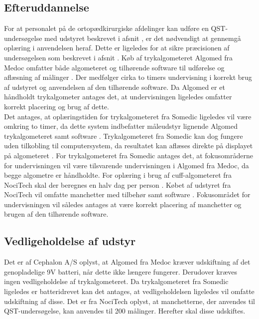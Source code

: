 \subsection{Efteruddannelse}
For at personalet på de ortopædkirurgiske afdelinger kan udføre en QST-undersøgelse med udstyret beskrevet i afsnit , er det nødvendigt at gennemgå oplæring i anvendelsen heraf. Dette er ligeledes for at sikre præcisionen af undersøgelsen som beskrevet i afsnit . Køb af trykalgometeret Algomed fra Medoc omfatter både algometeret og tilhørende software til udførelse og aflæsning af målinger \citep{AlgomedData}. Der medfølger cirka to timers undervisning i korrekt brug af udstyret og anvendelsen af den tilhørende software. Da Algomed er et håndholdt trykalgometer antages det, at undervisningen ligeledes omfatter korrekt placering og brug af dette. \\
Det antages, at oplæringstiden for trykalgometeret fra Somedic ligeledes vil være omkring to timer, da dette system indbefatter måleudstyr lignende Algomed trykalgometeret samt software \citep{SomedicSenselab2016}. Trykalgometeret fra Somedic kan dog fungere uden tilkobling til computersystem, da resultatet kan aflæses direkte på displayet på algometeret \citep{SomedicSenselab2016}. For trykalgometeret fra Somedic antages det, at fokusområderne for undervisningen vil være tilsvarende undervisningen i Algomed fra Medoc, da begge algometre er håndholdte.
For oplæring i brug af cuff-algometeret fra NociTech skal der beregnes en halv dag per person \citep{mail_fra_nocitech}. Købet af udstyret fra NociTech vil omfatte manchetter med tilbehør samt software \citep{NociTech2016}. Fokusområdet for undervisningen vil således antages at være korrekt placering af manchetter og brugen af den tilhørende software.   

\subsection{Vedligeholdelse af udstyr}
Det er af Cephalon A/S oplyst, at Algomed fra Medoc kræver udskiftning af det genopladelige 9V batteri, når dette ikke længere fungerer. Derudover kræves ingen vedligeholdelse af trykalgometeret. Da trykalgometeret fra Somedic ligeledes er batteridrevet kan det antages, at vedligeholdelsen ligeledes vil omfatte udskiftning af disse. 
Det er fra NociTech oplyst, at manchetterne, der anvendes til QST-undersøgelse, kan anvendes til 200 målinger. Herefter skal disse udskiftes.

